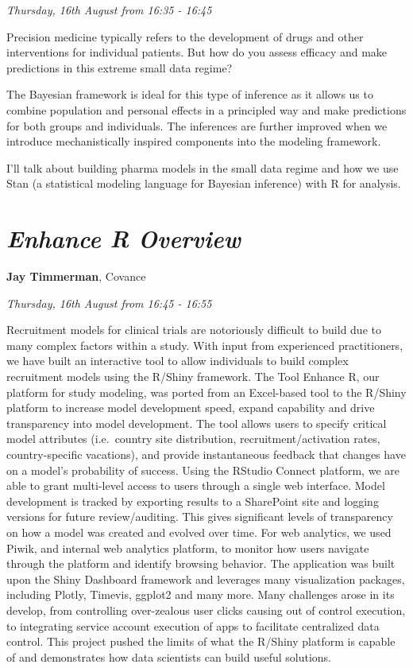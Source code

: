 \documentclass[]{book}
\theoremstyle{definition}
\theoremstyle{definition}
\theoremstyle{definition}
\theoremstyle{remark}
\begin{document}
\emph{Thursday, 16th August from 16:35 - 16:45}

Precision medicine typically refers to the development of drugs and
other interventions for individual patients. But how do you assess
efficacy and make predictions in this extreme small data regime?

The Bayesian framework is ideal for this type of inference as it allows
us to combine population and personal effects in a principled way and
make predictions for both groups and individuals. The inferences are
further improved when we introduce mechanistically inspired components
into the modeling framework.

I'll talk about building pharma models in the small data regime and how
we use Stan (a statistical modeling language for Bayesian inference)
with R for analysis.

\hypertarget{enhance-r-overview-1}{%
\section{\texorpdfstring{\emph{Enhance R
Overview}}{Enhance R Overview}}\label{enhance-r-overview-1}}

\textbf{Jay Timmerman}, Covance

\emph{Thursday, 16th August from 16:45 - 16:55}

Recruitment models for clinical trials are notoriously difficult to
build due to many complex factors within a study. With input from
experienced practitioners, we have built an interactive tool to allow
individuals to build complex recruitment models using the R/Shiny
framework. The Tool Enhance R, our platform for study modeling, was
ported from an Excel-based tool to the R/Shiny platform to increase
model development speed, expand capability and drive transparency into
model development. The tool allows users to specify critical model
attributes (i.e.~country site distribution, recruitment/activation
rates, country-specific vacations), and provide instantaneous feedback
that changes have on a model's probability of success. Using the RStudio
Connect platform, we are able to grant multi-level access to users
through a single web interface. Model development is tracked by
exporting results to a SharePoint site and logging versions for future
review/auditing. This gives significant levels of transparency on how a
model was created and evolved over time. For web analytics, we used
Piwik, and internal web analytics platform, to monitor how users
navigate through the platform and identify browsing behavior. The
application was built upon the Shiny Dashboard framework and leverages
many visualization packages, including Plotly, Timevis, ggplot2 and many
more. Many challenges arose in its develop, from controlling
over-zealous user clicks causing out of control execution, to
integrating service account execution of apps to facilitate centralized
data control. This project pushed the limits of what the R/Shiny
platform is capable of and demonstrates how data scientists can build
useful solutions.
\end{document}
